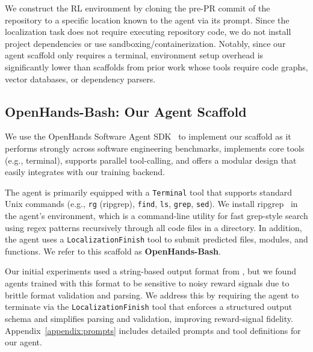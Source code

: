 We construct the RL environment by cloning the pre-PR commit of the repository to a specific location known to the agent via its prompt. Since the localization task does not require executing repository code, we do not install project dependencies or use sandboxing/containerization. Notably, since our agent scaffold only requires a terminal, environment setup overhead is significantly lower than scaffolds from prior work whose tools require code graphs, vector databases, or dependency parsers.

\subsection{OpenHands-Bash: Our Agent Scaffold}\label{sec:agent_scaffold}

We use the OpenHands Software Agent SDK~\cite{wang2025openhandssoftwareagentsdk} to implement our scaffold as it performs strongly across software engineering benchmarks, implements core tools (e.g., terminal), supports parallel tool-calling, and offers a modular design that easily integrates with our training backend.

The agent is primarily equipped with a \texttt{Terminal} tool that supports standard Unix commands (e.g., \texttt{rg} (ripgrep), \texttt{find}, \texttt{ls}, \texttt{grep}, \texttt{sed}). We install ripgrep~\citep{ripgrep} in the agent's environment, which is a command-line utility for fast grep-style search using regex patterns recursively through all code files in a directory. In addition, the agent uses a \texttt{LocalizationFinish} tool to submit predicted files, modules, and functions. We refer to this scaffold as \textbf{OpenHands-Bash}.

Our initial experiments used a string-based output format from \citet{chen-etal-2025-locagent}, but we found agents trained with this format to be sensitive to noisy reward signals due to brittle format validation and parsing. We address this by requiring the agent to terminate via the \texttt{LocalizationFinish} tool that enforces a structured output schema and simplifies parsing and validation, improving reward-signal fidelity. Appendix~\ref{appendix:prompts} includes detailed prompts and tool definitions for our agent.


